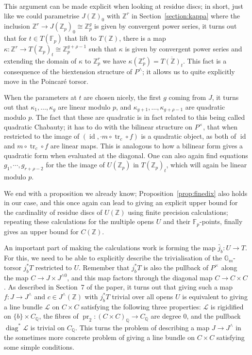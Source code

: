 \documentclass[12pt]{article}
\newcommand{\Z}{\mathbb{Z}}
\renewcommand{\G}{\mathbb{G}}
\newcommand{\Q}{\mathbb{Q}}
\newcommand{\Lcal}{\mathcal{L}}
\newcommand{\F}{\mathbb{F}}
\DeclareMathOperator{\id}{id}
\DeclareMathOperator{\tr}{tr}
\DeclareMathOperator{\pr}{pr}
\DeclareMathOperator{\diag}{diag}
\theoremstyle{plain}
\theoremstyle{definition}
\theoremstyle{remark}
\begin{document}
This argument can be made explicit when looking at residue discs; in short, just like we could parametrise $J(\Z)_0$ with $\Z^r$ in Section~\ref{section:kappa} where the inclusion $\Z^r \to J(\Z_p)_0 \cong \Z_p^{g}$ is given by convergent power series, it turns out that for $t \in T(\F_p)$ that lift to $T(\Z)$, there is a map $\kappa: \Z^r \to T(\Z_p)_t \cong \Z_p^{g+\rho-1}$ such that $\kappa$ is given by convergent power series and extending the domain of $\kappa$ to $\Z_p^r$ we have $\kappa(\Z_p^r) = \overline{T(\Z)_t}$. This fact is a consequence of the biextension structure of $P^\wedge$; it allows us to quite explicitly move in the Poincar\'e torsor.

When the parameters at $t$ are chosen nicely, the first $g$ coming from $J$, it turns out that $\kappa_1,\dots,\kappa_g$ are linear modulo $p$, and $\kappa_{g+1},\dots,\kappa_{g+\rho-1}$ are quadratic modulo $p$. The fact that these are quadratic is in fact related to this being called quadratic Chabauty; it has to do with the bilinear structure on $P^\times$, that when restricted to the image of $(\id,\cdot m \circ\tr_c \circ f)$ is a quadratic object, as both of $\id$ and $m \circ\tr_c \circ f$ are linear maps. This is analogous to how a bilinear form gives a quadratic form when evaluated at the diagonal. One can also again find equations $g_1,\cdots,g_{r+\rho-2}$ for the the image of $U(\Z_p)$ in $T(\Z_p)_t$, which will again be linear modulo $p$.

We end with a proposition we already know; Proposition~\ref{prop:finedix} also holds in our case, and this once again can lead to giving an explicit upper bound for the cardinality of residue discs of $U(\Z)$ using finite precision calculations; repeating these calculations for the multiple opens $U$ and their $\F_p$-points, finally gives an upper bound for $C(\Z)$.

An important part of making the calculations work is forming the map $\widetilde{j_b}: U \to T$. For this, we need to be able to explicitly describe the trivialisation of the $\G_m$-torsor $j_b^* T$ restricted to $U$. Remember that $j_b^* T$ is also the pullback of $P^\times$ along the map $C \to J \times J^{\wedge 0}$, and this map factors through the diagonal map $C \to C\times C$. As described in Section~7 of the paper, it turns out that giving such a map $f: J \to J^{\wedge}$ and $c \in J^\wedge(\Z)$ with $j_b^* T$ trivial over all opens $U$ is equivalent to giving a line bundle $\Lcal$ on $C \times C$ satisfying the following three properties: $\Lcal$ is rigidified on $\{b\} \times C_\Q$, the fibres of $\pr_2: (C \times C)_\Q \to C_\Q$ are degree $0$, and the pullback $\diag^* \Lcal$ is trivial on $C_\Q$. This turns the problem of describing a map $J \to J^\wedge$ in the sometimes more concrete problem of giving a line bundle on $C \times C$ satisfying some simple conditions.
\end{document}

